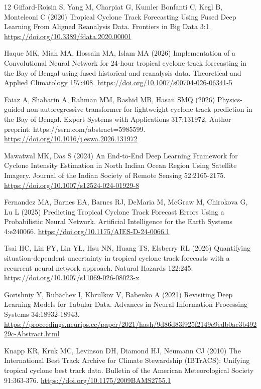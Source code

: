 \documentclass[pdflatex,sn-mathphys-num,referee,a4paper]{sn-jnl}
\begin{document}
\begin{thebibliography}{12}
Giffard-Roisin S, Yang M, Charpiat G, Kumler Bonfanti C, Kegl B, Monteleoni C (2020) Tropical Cyclone Track Forecasting Using Fused Deep Learning From Aligned Reanalysis Data. Frontiers in Big Data 3:1. \url{https://doi.org/10.3389/fdata.2020.00001}

Haque MK, Miah MA, Hossain MA, Islam MA (2026) Implementation of a Convolutional Neural Network for 24-hour tropical cyclone track forecasting in the Bay of Bengal using fused historical and reanalysis data. Theoretical and Applied Climatology 157:408. \url{https://doi.org/10.1007/s00704-026-06341-5}

Faiaz A, Shaharin A, Rahman MM, Rashid MB, Hasan SMQ (2026) Physics-guided non-autoregressive transformer for lightweight cyclone track prediction in the Bay of Bengal. Expert Systems with Applications 317:131972. Author preprint: https://ssrn.com/abstract=5985599. \url{https://doi.org/10.1016/j.eswa.2026.131972}

Mawatwal MK, Das S (2024) An End-to-End Deep Learning Framework for Cyclone Intensity Estimation in North Indian Ocean Region Using Satellite Imagery. Journal of the Indian Society of Remote Sensing 52:2165-2175. \url{https://doi.org/10.1007/s12524-024-01929-8}

Fernandez MA, Barnes EA, Barnes RJ, DeMaria M, McGraw M, Chirokova G, Lu L (2025) Predicting Tropical Cyclone Track Forecast Errors Using a Probabilistic Neural Network. Artificial Intelligence for the Earth Systems 4:e240066. \url{https://doi.org/10.1175/AIES-D-24-0066.1}

Tsai HC, Lin FY, Lin YL, Hsu NN, Huang TS, Elsberry RL (2026) Quantifying situation-dependent uncertainty in tropical cyclone track forecasts with a recurrent neural network approach. Natural Hazards 122:245. \url{https://doi.org/10.1007/s11069-026-08023-x}

Gorishniy Y, Rubachev I, Khrulkov V, Babenko A (2021) Revisiting Deep Learning Models for Tabular Data. Advances in Neural Information Processing Systems 34:18932-18943. \url{https://proceedings.neurips.cc/paper/2021/hash/9d86d83f925f2149e9edb0ac3b49229c-Abstract.html}

Knapp KR, Kruk MC, Levinson DH, Diamond HJ, Neumann CJ (2010) The International Best Track Archive for Climate Stewardship (IBTrACS): Unifying tropical cyclone best track data. Bulletin of the American Meteorological Society 91:363-376. \url{https://doi.org/10.1175/2009BAMS2755.1}


\end{thebibliography}
\end{document}
